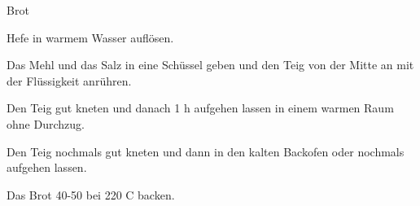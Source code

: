 
\begin{recipe}[]{Brot}{}{}



\step
Hefe in warmem Wasser aufl\"osen.

\step
Das Mehl und das Salz in eine Sch\"ussel geben und den Teig von der Mitte an mit der Fl\"ussigkeit anr\"uhren.

\step
Den Teig gut kneten und danach 1 h aufgehen lassen in einem warmen Raum ohne Durchzug.

\step
Den Teig nochmals gut kneten und dann in den kalten Backofen oder nochmals aufgehen lassen.

\step
Das Brot 40-50 \min bei 220 C backen.

\end{recipe}